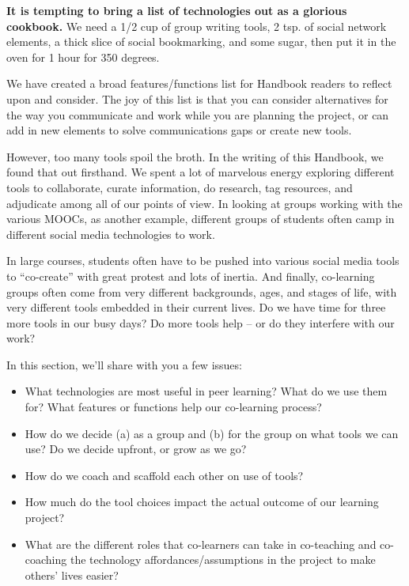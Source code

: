 \textbf{It is tempting to bring a list of technologies out as a glorious
cookbook.} We need a 1/2 cup of group writing tools, 2 tsp. of social
network elements, a thick slice of social bookmarking, and some sugar,
then put it in the oven for 1 hour for 350 degrees.

We have created a broad features/functions list for Handbook readers to
reflect upon and consider. The joy of this list is that you can consider
alternatives for the way you communicate and work while you are planning
the project, or can add in new elements to solve communications gaps or
create new tools.

However, too many tools spoil the broth. In the writing of this
Handbook, we found that out firsthand. We spent a lot of marvelous
energy exploring different tools to collaborate, curate information, do
research, tag resources, and adjudicate among all of our points of view.
In looking at groups working with the various MOOCs, as another example,
different groups of students often camp in different social media
technologies to work.

In large courses, students often have to be pushed into various social
media tools to ``co-create'' with great protest and lots of inertia. And
finally, co-learning groups often come from very different backgrounds,
ages, and stages of life, with very different tools embedded in their
current lives. Do we have time for three more tools in our busy days? Do
more tools help -- or do they interfere with our work?

In this section, we'll share with you a few issues:

\begin{itemize}
\itemsep1pt\parskip0pt
\item
  What technologies are most useful in peer learning? What do we use
  them for? What features or functions help our co-learning process?
\item
  How do we decide (a) as a group and (b) for the group on what tools we
  can use? Do we decide upfront, or grow as we go?
\item
  How do we coach and scaffold each other on use of tools?
\item
  How much do the tool choices impact the actual outcome of our learning
  project?
\item
  What are the different roles that co-learners can take in co-teaching
  and co-coaching the technology affordances/assumptions in the project
  to make others' lives easier?
\end{itemize}

